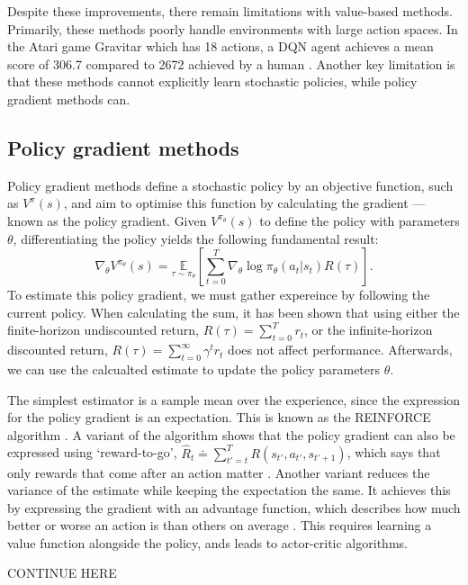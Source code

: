 \documentclass[12pt,a4paper]{article}
\begin{document}
Despite these improvements, there remain limitations with value-based methods. Primarily, these methods poorly handle environments with large action spaces. In the Atari game Gravitar which has 18 actions, a DQN agent achieves a mean score of 306.7 compared to 2672 achieved by a human \cite{Mnih2015}. Another key limitation is that these methods cannot explicitly learn stochastic policies, while policy gradient methods can.

\subsection{Policy gradient methods}
Policy gradient methods define a stochastic policy by an objective function, such as $V^{\pi}(s)$, and aim to optimise this function by calculating the gradient --- known as the policy gradient. Given $V^{\pi_{\theta}}(s)$ to define the policy with parameters $\theta$, differentiating the policy yields the following fundamental result: $$\nabla_{\theta} V^{\pi_{\theta}}(s) = \underset{\tau \sim \pi_{\theta}}{\mathbb{E}} \left[{\sum_{t=0}^{T} \nabla_{\theta} \log \pi_{\theta}(a_t |s_t) R(\tau)}\right].$$ To estimate this policy gradient, we must gather expereince by following the current policy. When calculating the sum, it has been shown that using either the finite-horizon undiscounted return, $R(\tau) = \sum_{t=0}^T r_t$, or the infinite-horizon discounted return, $R(\tau) = \sum_{t=0}^{\infty} \gamma^t r_t$ does not affect performance. Afterwards, we can use the calcualted estimate to update the policy parameters $\theta$.

The simplest estimator is a sample mean over the experience, since the expression for the policy gradient is an expectation. This is known as the REINFORCE algorithm \cite{Williams1992}. A variant of the algorithm shows that the policy gradient can also be expressed using `reward-to-go', $\hat{R}_t \doteq \sum_{t'=t}^T R(s_{t'}, a_{t'}, s_{t'+1})$, which says that only rewards that come after an action matter \cite{SpinningUp2018}. Another variant reduces the variance of the estimate while keeping the expectation the same. It achieves this by expressing the gradient with an advantage function, which describes how much better or worse an action is than others on average \cite{SpinningUp2018}. This requires learning a value function alongside the policy, ands leads to actor-critic algorithms. 

CONTINUE HERE
\end{document}
